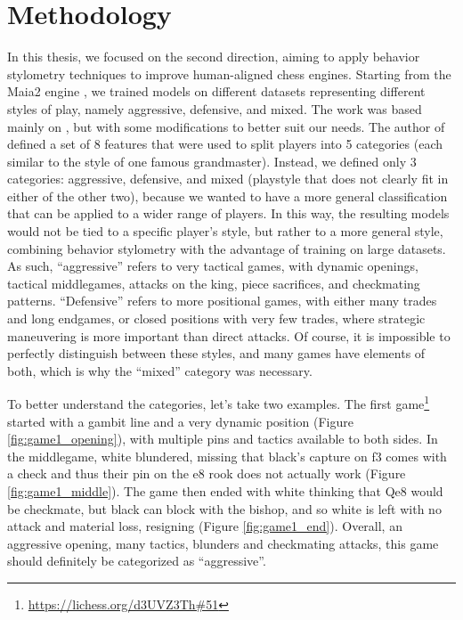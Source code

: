 \section{Methodology}
\label{section:methodology_behavior_stylometry}
In this thesis, we focused on the second direction, aiming to apply behavior stylometry techniques to improve human-aligned chess engines.
Starting from the Maia2 engine \cite{maia2}, we trained models on different datasets representing different styles of play, namely aggressive, defensive, and mixed.
The work was based mainly on \cite{chess_stylometry2}, but with some modifications to better suit our needs.
The author of \cite{chess_stylometry2} defined a set of 8 features that were used to split players into 5 categories (each similar to the style of one famous grandmaster).
Instead, we defined only 3 categories: aggressive, defensive, and mixed (playstyle that does not clearly fit in either of the other two), because we wanted to have a more general classification that can be applied to a wider range of players.
In this way, the resulting models would not be tied to a specific player's style, but rather to a more general style, combining behavior stylometry with the advantage of training on large datasets.
As such, ``aggressive'' refers to very tactical games, with dynamic openings, tactical middlegames, attacks on the king, piece sacrifices, and checkmating patterns.
``Defensive'' refers to more positional games, with either many trades and long endgames, or closed positions with very few trades, where strategic maneuvering is more important than direct attacks.
Of course, it is impossible to perfectly distinguish between these styles, and many games have elements of both, which is why the ``mixed'' category was necessary.

To better understand the categories, let's take two examples.
The first game\footnote{\url{https://lichess.org/d3UVZ3Th\#51}} started with a gambit line and a very dynamic position (Figure \ref{fig:game1_opening}), with multiple pins and tactics available to both sides.
In the middlegame, white blundered, missing that black's capture on f3 comes with a check and thus their pin on the e8 rook does not actually work (Figure \ref{fig:game1_middle}).
The game then ended with white thinking that Qe8 would be checkmate, but black can block with the bishop, and so white is left with no attack and material loss, resigning (Figure \ref{fig:game1_end}).
Overall, an aggressive opening, many tactics, blunders and checkmating attacks, this game should definitely be categorized as ``aggressive''.

